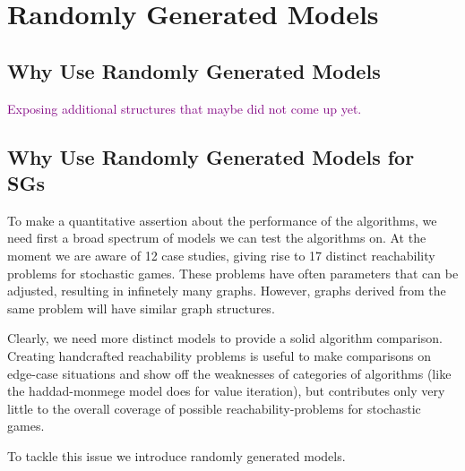 \chapter{Randomly Generated Models} \label{ch:randomGen}
\section{Why Use Randomly Generated Models}
\textcolor{purple}{Exposing additional structures that maybe did not come up yet.}

\section{Why Use Randomly Generated Models for SGs}
To make a quantitative assertion about the performance of the algorithms, we need first a broad spectrum of models we can test the algorithms on. At the moment we are aware of 12 case studies, giving rise to 17 distinct reachability problems for stochastic games. These problems have often parameters that can be adjusted, resulting in infinetely many graphs. However, graphs derived from the same problem will have similar graph structures.

Clearly, we need more distinct models to provide a solid algorithm comparison. Creating handcrafted reachability problems is useful to make comparisons on edge-case situations and show off the weaknesses of categories of algorithms (like the haddad-monmege model does for value iteration), but contributes only very little to the overall coverage of possible reachability-problems for stochastic games.

To tackle this issue we introduce randomly generated models.



